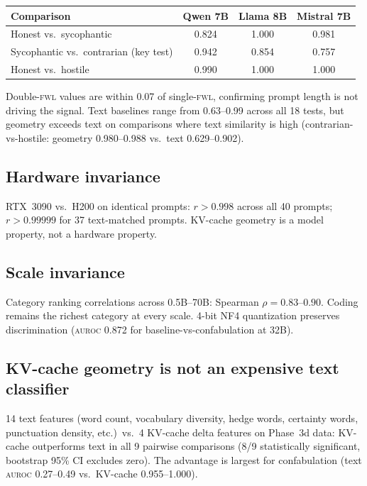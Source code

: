 \documentclass[11pt,letterpaper]{article}
\newcommand{\auroc}{\textsc{auroc}\xspace}
\newcommand{\fwl}{\textsc{fwl}\xspace}
\newcommand{\kvcache}{KV-cache\xspace}
\begin{document}
\begin{center}
\begin{tabular}{@{}lccc@{}}
  \toprule
  Comparison & Qwen 7B & Llama 8B & Mistral 7B \\
  \midrule
  Honest vs.\ sycophantic & 0.824 & 1.000 & 0.981 \\
  Sycophantic vs.\ contrarian (key test) & 0.942 & 0.854 & 0.757 \\
  Honest vs.\ hostile & 0.990 & 1.000 & 1.000 \\
  \bottomrule
\end{tabular}
\end{center}

Double-\fwl values are within 0.07 of single-\fwl, confirming prompt length is not driving the signal.
Text baselines range from 0.63--0.99 across all 18 tests, but geometry exceeds text on comparisons where text similarity is high (contrarian-vs-hostile: geometry 0.980--0.988 vs.\ text 0.629--0.902).

\subsection{Hardware invariance}

RTX~3090 vs.\ H200 on identical prompts: $r > 0.998$ across all 40 prompts; $r > 0.99999$ for 37 text-matched prompts.
KV-cache geometry is a model property, not a hardware property.

\subsection{Scale invariance}

Category ranking correlations across 0.5B--70B: Spearman $\rho = 0.83$--$0.90$.
Coding remains the richest category at every scale.
4-bit NF4 quantization preserves discrimination (\auroc 0.872 for baseline-vs-confabulation at 32B).

\subsection{KV-cache geometry is not an expensive text classifier}

14 text features (word count, vocabulary diversity, hedge words, certainty words, punctuation density, etc.)\ vs.\ 4 \kvcache delta features on Phase~3d data:
\kvcache outperforms text in all 9 pairwise comparisons (8/9 statistically significant, bootstrap 95\% CI excludes zero).
The advantage is largest for confabulation (text \auroc 0.27--0.49 vs.\ \kvcache 0.955--1.000).
\end{document}
